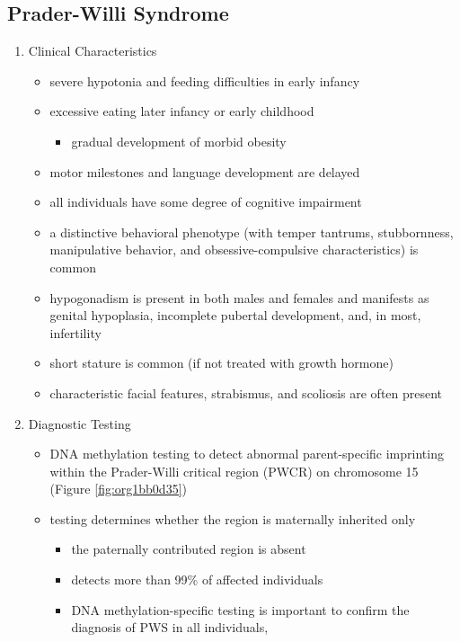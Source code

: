 \documentclass[12pt]{scrartcl}
\begin{document}
\subsection{Prader-Willi Syndrome}
\label{sec:org200c5d4}
\begin{enumerate}
\item Clinical Characteristics
\label{sec:orge6fd7b9}
\begin{itemize}
\item severe hypotonia and feeding difficulties in early infancy
\item excessive eating later infancy or early childhood
\begin{itemize}
\item gradual development of morbid obesity
\end{itemize}
\item motor milestones and language development are delayed
\item all individuals have some degree of cognitive impairment
\item a distinctive behavioral phenotype (with temper tantrums,
stubbornness, manipulative behavior, and obsessive-compulsive
characteristics) is common
\item hypogonadism is present in both males and females and manifests as
genital hypoplasia, incomplete pubertal development, and, in most,
infertility
\item short stature is common (if not treated with growth hormone)
\item characteristic facial features, strabismus, and scoliosis are often
present
\end{itemize}

\item Diagnostic Testing
\label{sec:org62c6ade}
\begin{itemize}
\item DNA methylation testing to detect abnormal parent-specific
imprinting within the Prader-Willi critical region (PWCR) on
chromosome 15 (Figure \ref{fig:org1bb0d35})
\item testing determines whether the region is maternally inherited only
\begin{itemize}
\item the paternally contributed region is absent
\item detects more than 99\% of affected individuals
\item DNA methylation-specific testing is important to confirm the
diagnosis of PWS in all individuals,
\end{itemize}
\end{itemize}


\end{enumerate}
\end{document}

